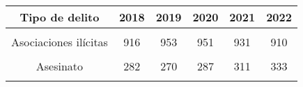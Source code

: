 \begin{tabular}[t]{cccccc}
\toprule
\textbf{Tipo de delito} & \textbf{2018} & \textbf{2019} & \textbf{2020} & \textbf{2021} & \textbf{2022}\\
\midrule
\cellcolor[HTML]{B6B3FF}{Extorsión} & \cellcolor[HTML]{B6B3FF}{1,219} & \cellcolor[HTML]{B6B3FF}{1,418} & \cellcolor[HTML]{B6B3FF}{1,513} & \cellcolor[HTML]{B6B3FF}{1,667} & \cellcolor[HTML]{B6B3FF}{2,278}\\
Asociaciones ilícitas & 916 & 953 & 951 & 931 & 910\\
\cellcolor[HTML]{B6B3FF}{Obstrucción extorsiva de tránsito} & \cellcolor[HTML]{B6B3FF}{424} & \cellcolor[HTML]{B6B3FF}{449} & \cellcolor[HTML]{B6B3FF}{451} & \cellcolor[HTML]{B6B3FF}{414} & \cellcolor[HTML]{B6B3FF}{414}\\
Asesinato & 282 & 270 & 287 & 311 & 333\\
\cellcolor[HTML]{B6B3FF}{Lavado de dinero u otros activos} & \cellcolor[HTML]{B6B3FF}{160} & \cellcolor[HTML]{B6B3FF}{179} & \cellcolor[HTML]{B6B3FF}{174} & \cellcolor[HTML]{B6B3FF}{178} & \cellcolor[HTML]{B6B3FF}{185}\\
\bottomrule
\end{tabular}
